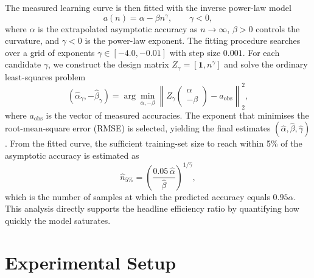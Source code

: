 \documentclass{article}
\begin{document}
The measured learning curve is then fitted with the inverse power-law model
\begin{equation}
a(n) = \alpha - \beta n^{\gamma}, \qquad \gamma < 0,
\end{equation}
where \(\alpha\) is the extrapolated asymptotic accuracy as \(n \to \infty\), \(\beta > 0\) controls the curvature, and \(\gamma < 0\) is the power-law exponent. The fitting procedure searches over a grid of exponents \(\gamma \in [-4.0, -0.01]\) with step size \(0.001\). For each candidate \(\gamma\), we construct the design matrix \(Z_{\gamma} = [\mathbf{1}, n^{\gamma}]\) and solve the ordinary least-squares problem
\begin{equation}
(\hat{\alpha}_{\gamma}, -\hat{\beta}_{\gamma}) = \arg\min_{\alpha, -\beta} \left\| Z_{\gamma} \begin{pmatrix} \alpha \\ -\beta \end{pmatrix} - a_{\text{obs}} \right\|_2^2,
\end{equation}
where \(a_{\text{obs}}\) is the vector of measured accuracies. The exponent that minimises the root-mean-square error (RMSE) is selected, yielding the final estimates \((\hat{\alpha}, \hat{\beta}, \hat{\gamma})\). From the fitted curve, the sufficient training-set size to reach within 5\% of the asymptotic accuracy is estimated as
\begin{equation}
\hat{n}_{5\%} = \left( \frac{0.05 \, \hat{\alpha}}{\hat{\beta}} \right)^{1/\hat{\gamma}},
\end{equation}
which is the number of samples at which the predicted accuracy equals \(0.95 \hat{\alpha}\). This analysis directly supports the headline efficiency ratio by quantifying how quickly the model saturates.

\section{Experimental Setup}
\label{sec:setup}
\end{document}
